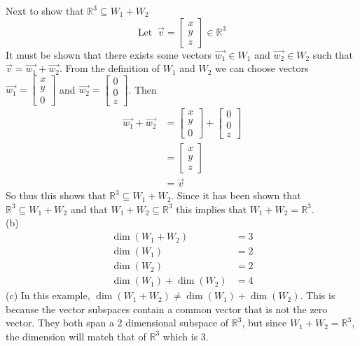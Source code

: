 \documentclass{report}
\begin{document}
\noindent Next to show that $\mathbb{R}^3 \subseteq W_1 + W_2$
$$
\text{Let}\;\;\vec{v}=\begin{bmatrix} x \\ y \\ z \end{bmatrix} \in \mathbb{R}^3
$$
It must be shown that there exists some vectors $\vec{w_1}\in W_1$ and $\vec{w_2}\in W_2$ such that $\vec{v} = \vec{w_1} + \vec{w_2}$. From the definition of $W_1$ and $W_2$ we can choose vectors $\vec{w_1} = \begin{bmatrix} x \\ y \\ 0 \end{bmatrix}$ and $\vec{w_2} = \begin{bmatrix} 0 \\ 0 \\ z \end{bmatrix}$. Then
$$
\begin{aligned}
	\vec{w_1} + \vec{w_2} & = \begin{bmatrix} x \\ y \\ 0 \end{bmatrix} + \begin{bmatrix} 0 \\ 0 \\ z \end{bmatrix} \\
	& = \begin{bmatrix} x \\ y \\ z \end{bmatrix} \\
	& = \vec{v}
\end{aligned}
$$
So thus this shows that $\mathbb{R}^3\subseteq W_1 + W_2$. Since it has been shown that $\mathbb{R}^3\subseteq W_1 + W_2$ and that $W_1 + W_2 \subseteq \mathbb{R}^3$ this implies that $W_1 + W_2 = \mathbb{R}^3$. \\
\noindent (b)
$$
\begin{aligned}
\operatorname{dim}\left(W_1+W_2\right) & = 3 \\
\operatorname{dim}\left(W_1\right) & = 2 \\
\operatorname{dim}\left(W_2\right) & = 2 \\
\operatorname{dim}\left(W_1\right) + \operatorname{dim}\left(W_2\right) & = 4
\end{aligned}
$$
(c) In this example, $\operatorname{dim}\left(W_1+W_2\right) \neq \operatorname{dim}\left(W_1\right) + \operatorname{dim}\left(W_2\right)$. This is because the vector subspaces contain a common vector that is not the zero vector. They both span a 2 dimensional subspace of $\mathbb{R}^3$, but since $W_1 + W_2 = \mathbb{R}^3$, the dimension will match that of $\mathbb{R}^3$ which is 3.
\end{document}
